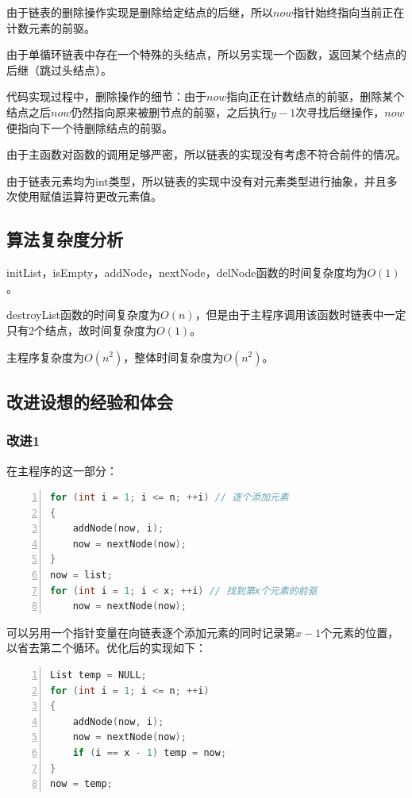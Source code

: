 \documentclass{article}
\begin{document}
由于链表的删除操作实现是删除给定结点的后继，所以$now$指针始终指向当前正在计数元素的前驱。

由于单循环链表中存在一个特殊的头结点，所以另实现一个函数，返回某个结点的后继（跳过头结点）。

代码实现过程中，删除操作的细节：由于$now$指向正在计数结点的前驱，删除某个结点之后$now$仍然指向原来被删节点的前驱，之后执行$y-1$次寻找后继操作，$now$便指向下一个待删除结点的前驱。

由于主函数对函数的调用足够严密，所以链表的实现没有考虑不符合前件的情况。

由于链表元素均为int类型，所以链表的实现中没有对元素类型进行抽象，并且多次使用赋值运算符更改元素值。

\subsection{算法复杂度分析}

initList，isEmpty，addNode，nextNode，delNode函数的时间复杂度均为$O(1)$。

destroyList函数的时间复杂度为$O(n)$，但是由于主程序调用该函数时链表中一定只有2个结点，故时间复杂度为$O(1)$。

主程序复杂度为$O(n^2)$，整体时间复杂度为$O(n^2)$。

\subsection{改进设想的经验和体会}

\subsubsection{改进1}

在主程序的这一部分：

\begin{lstlisting}[language={C},
    numbers=left,
    numberstyle=\tiny\menlo,
    basicstyle=\small\menlo]
for (int i = 1; i <= n; ++i) // 逐个添加元素
{
    addNode(now, i);
    now = nextNode(now);
}
now = list;
for (int i = 1; i < x; ++i) // 找到第x个元素的前驱
    now = nextNode(now);
\end{lstlisting}

可以另用一个指针变量在向链表逐个添加元素的同时记录第$x-1$个元素的位置，以省去第二个循环。优化后的实现如下：

\begin{lstlisting}[language={C},
    numbers=left,
    numberstyle=\tiny\menlo,
    basicstyle=\small\menlo]
List temp = NULL;
for (int i = 1; i <= n; ++i)
{
    addNode(now, i);
    now = nextNode(now);
    if (i == x - 1) temp = now;
}
now = temp;
\end{lstlisting}
\end{document}
